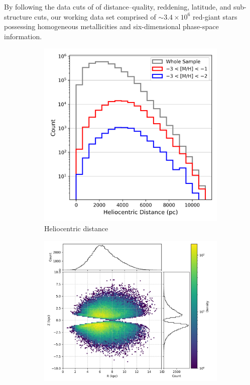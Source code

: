 \documentclass[a4paper,12pt]{article}
\begin{document}
By following the data cuts of \citet{zhang2024existencemetalpoordiscmilky} of
distance–quality, reddening, latitude, and 
sub-structure cuts, our working data set comprised of $\sim3.4\times10^{6}$ 
red-giant stars possessing homogeneous metallicities and six-dimensional 
phase-space information.  

\begin{figure}
  \centering
  \begin{subfigure}[b]{0.32\textwidth}
    \includegraphics[width=\textwidth]{../figures/distance_histogram.png}
    \caption{Heliocentric distance}
    \label{fig:dist_hist}
  \end{subfigure}\hfill
  \begin{subfigure}[b]{0.32\textwidth}
    \includegraphics[width=\textwidth]{../figures/ZR_distribution.png}

\end{subfigure}
\end{figure}
\end{document}
